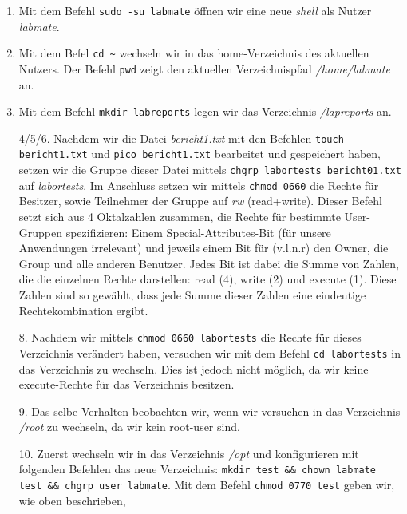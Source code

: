 \documentclass{scrartcl}
\begin{document}
    \begin{enumerate}[1.]
      \item Mit dem Befehl \texttt{sudo -su labmate} öffnen wir eine neue \textit{shell}
            als Nutzer \textit{labmate}.
      \item Mit dem Befel \texttt{cd \~} wechseln wir in das home-Verzeichnis des
            aktuellen Nutzers. Der Befehl \texttt{pwd} zeigt den aktuellen
            Verzeichnispfad \textit{/home/labmate} an.
      \item Mit dem Befehl \texttt{mkdir labreports} legen wir das Verzeichnis
            \textit{/lapreports} an.
      \item[4/5/6.] Nachdem wir die Datei \textit{bericht1.txt} mit den Befehlen
            \texttt{touch bericht1.txt} und \texttt{pico bericht1.txt} bearbeitet und
            gespeichert haben, setzen wir die Gruppe dieser Datei mittels
            \texttt{chgrp labortests bericht01.txt} auf \textit{labortests}.
            Im Anschluss setzen wir mittels \texttt{chmod 0660} die Rechte für
            Besitzer, sowie Teilnehmer der Gruppe auf \textit{rw} (read+write).
            Dieser Befehl setzt sich aus 4 Oktalzahlen zusammen, die Rechte für bestimmte
            User-Gruppen spezifizieren: Einem Special-Attributes-Bit (für unsere Anwendungen
            irrelevant) und jeweils einem Bit für (v.l.n.r) den Owner, die Group und alle
            anderen Benutzer. Jedes Bit ist dabei die Summe von Zahlen, die die einzelnen 
            Rechte darstellen: read (4), write (2) und execute (1). Diese Zahlen sind so
            gewählt, dass jede Summe dieser Zahlen eine eindeutige Rechtekombination ergibt.
      \item[8.] Nachdem wir mittels \texttt{chmod 0660 labortests} die Rechte für
            dieses Verzeichnis verändert haben, versuchen wir mit dem Befehl
            \texttt{cd labortests} in das Verzeichnis zu wechseln. Dies ist jedoch
            nicht möglich, da wir keine execute-Rechte für das Verzeichnis besitzen.
      \item[9.] Das selbe Verhalten beobachten wir, wenn wir versuchen in das Verzeichnis
            \textit{/root} zu wechseln, da wir kein root-user sind.
      \item[10.] Zuerst wechseln wir in das Verzeichnis \textit{/opt} und konfigurieren
            mit folgenden Befehlen das neue Verzeichnis:
            \texttt{mkdir test \&\& chown labmate test \&\& chgrp user labmate}.
            Mit dem Befehl \texttt{chmod 0770 test} geben wir, wie oben beschrieben,

\end{enumerate}
\end{document}
